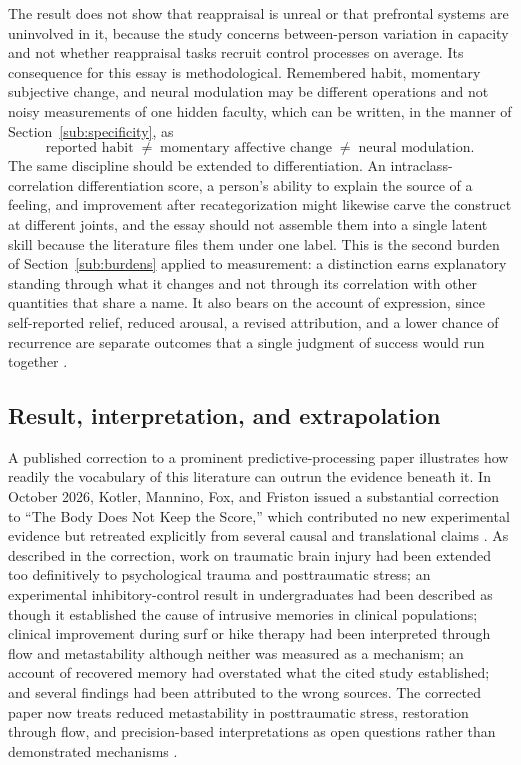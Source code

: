 \documentclass[11pt]{article}
\begin{document}
The result does not show that reappraisal is unreal or that prefrontal systems are uninvolved in it, because the study concerns between-person variation in capacity and not whether reappraisal tasks recruit control processes on average. Its consequence for this essay is methodological. Remembered habit, momentary subjective change, and neural modulation may be different operations and not noisy measurements of one hidden faculty, which can be written, in the manner of Section~\ref{sub:specificity}, as
\[
\text{reported habit}
\;\neq\;
\text{momentary affective change}
\;\neq\;
\text{neural modulation}.
\]
The same discipline should be extended to differentiation. An intraclass-correlation differentiation score, a person's ability to explain the source of a feeling, and improvement after recategorization might likewise carve the construct at different joints, and the essay should not assemble them into a single latent skill because the literature files them under one label. This is the second burden of Section~\ref{sub:burdens} applied to measurement: a distinction earns explanatory standing through what it changes and not through its correlation with other quantities that share a name. It also bears on the account of expression, since self-reported relief, reduced arousal, a revised attribution, and a lower chance of recurrence are separate outcomes that a single judgment of success would run together \citep{Sicorello2026}.

\subsection{Result, interpretation, and extrapolation}

A published correction to a prominent predictive-processing paper illustrates how readily the vocabulary of this literature can outrun the evidence beneath it. In October 2026, Kotler, Mannino, Fox, and Friston issued a substantial correction to ``The Body Does Not Keep the Score,'' which contributed no new experimental evidence but retreated explicitly from several causal and translational claims \citep{Kotler2026}. As described in the correction, work on traumatic brain injury had been extended too definitively to psychological trauma and posttraumatic stress; an experimental inhibitory-control result in undergraduates had been described as though it established the cause of intrusive memories in clinical populations; clinical improvement during surf or hike therapy had been interpreted through flow and metastability although neither was measured as a mechanism; an account of recovered memory had overstated what the cited study established; and several findings had been attributed to the wrong sources. The corrected paper now treats reduced metastability in posttraumatic stress, restoration through flow, and precision-based interpretations as open questions rather than demonstrated mechanisms \citep{Kotler2026}.
\end{document}
